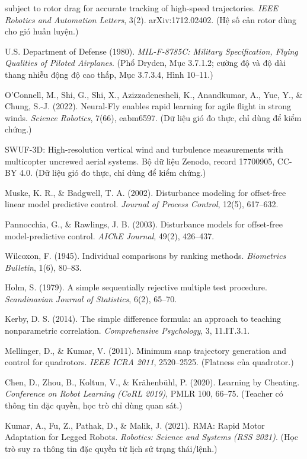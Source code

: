 \documentclass[11pt]{article}
\begin{document}
\begin{enumerate}[leftmargin=2.0em,itemsep=1pt,label={[\arabic*]}]
subject to rotor drag for accurate tracking of high-speed trajectories. \emph{IEEE Robotics and Automation
Letters}, 3(2). arXiv:1712.02402. (Hệ số cản rotor dùng cho gió huấn luyện.)
\item U.S. Department of Defense (1980). \emph{MIL-F-8785C: Military Specification, Flying Qualities of Piloted
Airplanes}. (Phổ Dryden, Mục 3.7.1.2; cường độ và độ dài thang nhiễu động độ cao thấp, Mục 3.7.3.4, Hình 10--11.)
\item O'Connell, M., Shi, G., Shi, X., Azizzadenesheli, K., Anandkumar, A., Yue, Y., \& Chung, S.-J. (2022).
Neural-Fly enables rapid learning for agile flight in strong winds. \emph{Science Robotics}, 7(66),
eabm6597. (Dữ liệu gió đo thực, chỉ dùng để kiểm chứng.)
\item SWUF-3D: High-resolution vertical wind and turbulence measurements with multicopter uncrewed aerial
systems. Bộ dữ liệu Zenodo, record 17700905, CC-BY 4.0. (Dữ liệu gió đo thực, chỉ dùng để kiểm chứng.)
\item Muske, K. R., \& Badgwell, T. A. (2002). Disturbance modeling for offset-free linear model predictive
control. \emph{Journal of Process Control}, 12(5), 617--632.
\item Pannocchia, G., \& Rawlings, J. B. (2003). Disturbance models for offset-free model-predictive control.
\emph{AIChE Journal}, 49(2), 426--437.
\item Wilcoxon, F. (1945). Individual comparisons by ranking methods. \emph{Biometrics Bulletin}, 1(6), 80--83.
\item Holm, S. (1979). A simple sequentially rejective multiple test procedure. \emph{Scandinavian Journal of
Statistics}, 6(2), 65--70.
\item Kerby, D. S. (2014). The simple difference formula: an approach to teaching nonparametric correlation.
\emph{Comprehensive Psychology}, 3, 11.IT.3.1.
\item Mellinger, D., \& Kumar, V. (2011). Minimum snap trajectory generation and control for quadrotors.
\emph{IEEE ICRA 2011}, 2520--2525. (Flatness của quadrotor.)
\item Chen, D., Zhou, B., Koltun, V., \& Kr\"ahenb\"uhl, P. (2020). Learning by Cheating. \emph{Conference on
Robot Learning (CoRL 2019)}, PMLR 100, 66--75. (Teacher có thông tin đặc quyền, học trò chỉ dùng quan sát.)
\item Kumar, A., Fu, Z., Pathak, D., \& Malik, J. (2021). RMA: Rapid Motor Adaptation for Legged Robots.
\emph{Robotics: Science and Systems (RSS 2021)}. (Học trò suy ra thông tin đặc quyền từ lịch sử trạng thái/lệnh.)
\end{enumerate}
\end{document}
